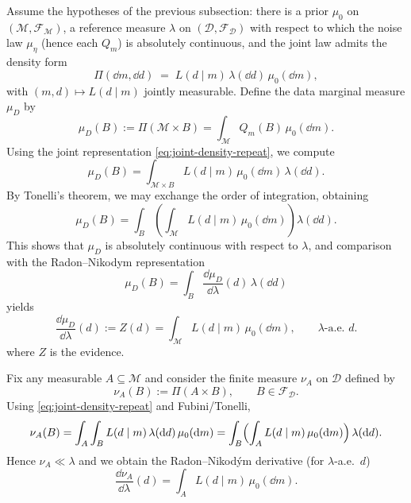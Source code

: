 \documentclass[11pt]{article}
\theoremstyle{remark}
\newcommand{\modelspace}{\mathcal{M}}
\newcommand{\dataspace}{\mathcal{D}}
\begin{document}
Assume the hypotheses of the previous subsection: there is a prior
\(\mu_0\) on \((\modelspace,\mathcal{F}_{\modelspace})\), a reference measure
\(\lambda\) on \((\dataspace,\mathcal{F}_{\dataspace})\) with respect to which
the noise law \(\mu_\eta\) (hence each \(Q_m\)) is absolutely continuous, and
the joint law admits the density form
\begin{equation}\label{eq:joint-density-repeat}
\Pi(\dd m,\dd d) \;=\; L(d\mid m)\,\lambda(\dd d)\,\mu_0(\dd m),
\end{equation}
with \((m,d)\mapsto L(d\mid m)\) jointly measurable. Define the data marginal
measure \(\mu_{D}\) by
\[
\mu_{D}(B):=\Pi(\modelspace\times B)=\int_{\modelspace}Q_m(B)\,\mu_0(\dd m).
\]
Using the joint representation \eqref{eq:joint-density-repeat}, we compute
\[
\mu_D(B)
=
\int_{\modelspace\times B}
L(d\mid m)\,\mu_0(\dd m)\,\lambda(\dd d).
\]
By Tonelli's theorem, we may exchange the order of integration, obtaining
\[
\mu_D(B)
=
\int_B
\left(
\int_{\modelspace} L(d\mid m)\,\mu_0(\dd m)
\right)
\lambda(\dd d).
\]
This shows that \(\mu_D\) is absolutely continuous with respect to \(\lambda\),
and comparison with the Radon--Nikodym representation
\[
\mu_D(B)=\int_B \frac{\dd\mu_D}{\dd\lambda}(d)\,\lambda(\dd d)
\]
yields
\begin{equation}\label{eq:evidence-repeat}
\frac{\dd\mu_D}{\dd\lambda}(d)
:= Z(d) = 
\int_{\modelspace} L(d\mid m)\,\mu_0(\dd m),
\qquad \lambda\text{-a.e. } d.
\end{equation}
where \(Z\) is the evidence. 

Fix any measurable \(A\subseteq\modelspace\) and consider the finite measure
\(\nu_A\) on \(\dataspace\) defined by
\[
\nu_A(B):=\Pi(A\times B),\qquad B\in\mathcal{F}_{\dataspace}.
\]
Using \eqref{eq:joint-density-repeat} and Fubini/Tonelli,
\begin{equation}\label{eq:nuA-integral}
\nu_A(B)
=
\int_A \int_B L(d\mid m)\,\lambda(\dd d)\,\mu_0(\dd m)
=
\int_B \Bigl(\int_A L(d\mid m)\,\mu_0(\dd m)\Bigr)\,\lambda(\dd d).
\end{equation}
Hence \(\nu_A\ll\lambda\) and we obtain the
Radon--Nikod\'ym derivative (for \(\lambda\)-a.e.\ \(d\))
\begin{equation}\label{eq:kA-expression}
\frac{\dd\nu_A}{\dd\lambda}(d)
=
\int_A L(d\mid m)\,\mu_0(\dd m).
\end{equation}
\end{document}
